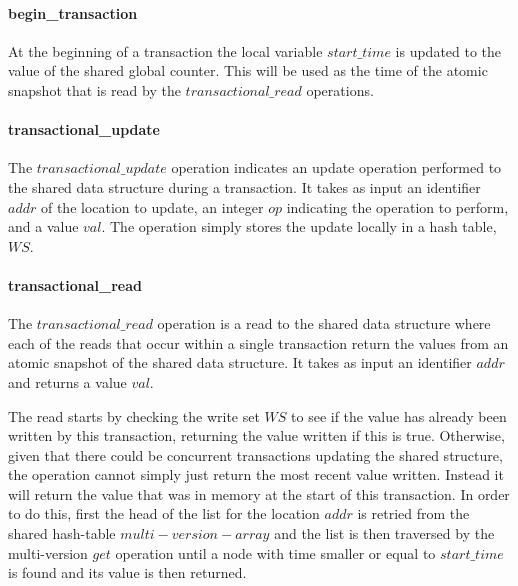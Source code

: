 \documentclass[11pt,letterpaper]{article}
\begin{document}
\paragraph{begin\_transaction}
At the beginning of a transaction the local variable $\mathit{start\_time}$
is updated to the value of the shared global counter.
This will be used as the time of the atomic snapshot that is read
by the $\mathit{transactional\_read}$ operations.

\paragraph{transactional\_update}
The $\mathit{transactional\_update}$ operation indicates an update operation
performed to the shared data structure during a transaction.
It takes as input an identifier $\mathit{addr}$ of the location to update,
an integer $\mathit{op}$ indicating the operation to perform, and a value $\mathit{val}$.
The operation simply stores the update locally in a hash table, $\mathit{WS}$.


\paragraph{transactional\_read}
The $\mathit{transactional\_read}$ operation is a read to the shared data structure
where each of the reads that occur within a single transaction return the values from
an atomic snapshot of the shared data structure.
It takes as input an identifier $\mathit{addr}$ and returns a value $\mathit{val}$.

The read starts by checking the write set $\mathit{WS}$ to see if the value has already been written
by this transaction, returning the value written if this is true.
Otherwise, given that there could be concurrent transactions updating the shared structure,
the operation cannot simply just return the most recent value written.
Instead it will return the value that was in memory at the start of this transaction.
In order to do this, first the head of the list for the location $\mathit{addr}$ is retried
from the shared hash-table $\mathit{multi-version-array}$ and the list is then traversed
by the multi-version $\mathit{get}$ operation
until a node with time smaller or equal to $\mathit{start\_time}$ is found and
its value is then returned.
\end{document}

